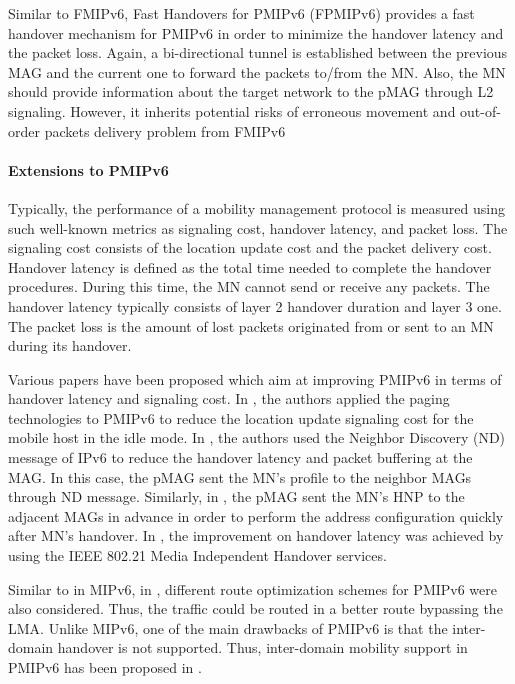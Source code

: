 Similar to FMIPv6, Fast Handovers for PMIPv6 (FPMIPv6) \cite{FPMIPv6} provides a fast handover mechanism for PMIPv6 in order to minimize the handover latency and the packet loss. Again, a bi-directional tunnel is established between the previous MAG and the current one to forward the packets to/from the MN. Also, the MN should provide information about the target network to the pMAG through L2 signaling. However, it inherits potential risks of erroneous movement and out-of-order packets delivery problem from FMIPv6

\paragraph{Extensions to PMIPv6}
Typically, the performance of a mobility management protocol is measured using such well-known metrics as signaling cost, handover latency, and packet loss. The signaling cost consists of the location update cost and the packet delivery cost. Handover latency is defined as the total time needed to complete the handover procedures. During this time, the MN cannot send or receive any packets. The handover latency typically consists of layer 2 handover duration and layer 3 one. The packet loss is the amount of lost packets originated from or sent to an MN during its handover. 

Various papers have been proposed which aim at improving PMIPv6 in terms of handover latency and signaling cost. In \cite{pmip_paging_Hong, pmip_paging_Lee}, the authors applied the paging technologies to PMIPv6 to reduce the location update signaling cost for the mobile host in the idle mode. In \cite{pmip_handover_latency_Kang}, the authors used the Neighbor Discovery (ND) message of IPv6 to reduce the handover latency and packet buffering at the MAG. In this case, the pMAG sent the MN's profile to the neighbor MAGs through ND message. Similarly, in \cite{pmip_handover_latency_Kim}, the pMAG sent the MN’s HNP to the adjacent MAGs in advance in order to perform the address configuration quickly after MN’s handover. In \cite{pmip_handover_latency_Magagula}, the improvement on handover latency was achieved by using the IEEE 802.21 Media Independent Handover services. 

Similar to in MIPv6, in \cite{RO_pmip_Krishnan, RO_pmip_Rasem}, different route optimization schemes for PMIPv6 were also considered. Thus, the traffic could be routed in a better route bypassing the LMA. Unlike MIPv6, one of the main drawbacks of PMIPv6 is that the inter-domain handover is not supported. Thus, inter-domain mobility support in PMIPv6 has been proposed in \cite{inter_pmip_Giaratta,inter_pmip_Neumann, inter_pmip_Ma,Thinh_WCNC_DMM}. 

